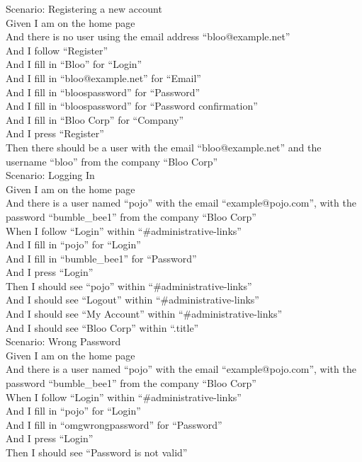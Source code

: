 \documentclass[12pt]{article}
\begin{document}
Scenario: Registering a new account \\
  Given I am on the home page \\
  And there is no user using the email address ``bloo@example.net'' \\
  And I follow ``Register'' \\
  And I fill in ``Bloo'' for ``Login'' \\
  And I fill in ``bloo@example.net'' for ``Email'' \\
  And I fill in ``bloospassword'' for ``Password'' \\
  And I fill in ``bloospassword'' for ``Password confirmation'' \\
  And I fill in ``Bloo Corp'' for ``Company'' \\
  And I press ``Register'' \\
  Then there should be a user with the email ``bloo@example.net'' and the username ``bloo'' from the company ``Bloo Corp'' \\

Scenario: Logging In \\
  Given I am on the home page \\
  And there is a user named ``pojo'' with the email ``example@pojo.com'', with the password ``bumble\_bee1'' from the company ``Bloo Corp'' \\
  When I follow ``Login'' within ``\#administrative-links'' \\
  And I fill in ``pojo'' for ``Login'' \\
  And I fill in ``bumble\_bee1'' for ``Password'' \\
  And I press ``Login'' \\
  Then I should see ``pojo'' within ``\#administrative-links'' \\
  And I should see ``Logout'' within ``\#administrative-links'' \\
  And I should see ``My Account'' within ``\#administrative-links'' \\
  And I should see ``Bloo Corp'' within ``.title'' \\

Scenario: Wrong Password \\
  Given I am on the home page \\
  And there is a user named ``pojo'' with the email ``example@pojo.com'', with the password ``bumble\_bee1'' from the company ``Bloo Corp'' \\
  When I follow ``Login'' within ``\#administrative-links'' \\
  And I fill in ``pojo'' for ``Login'' \\
  And I fill in ``omgwrongpassword'' for ``Password'' \\
  And I press ``Login'' \\
  Then I should see ``Password is not valid'' \\
\end{document}

